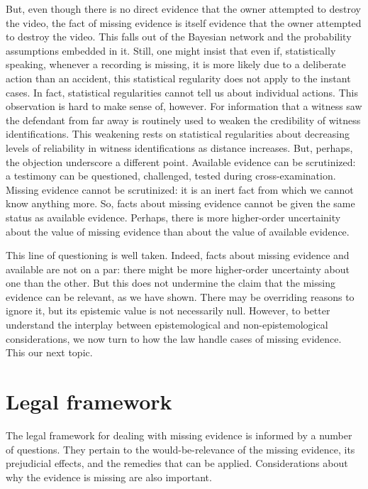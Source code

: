 \documentclass[
  10pt,
  dvipsnames,enabledeprecatedfontcommands]{scrartcl}
\begin{document}
But, even though there is no direct evidence that the owner attempted to
destroy the video, the fact of missing evidence is itself evidence that
the owner attempted to destroy the video. This falls out of the Bayesian
network and the probability assumptions embedded in it. Still, one might
insist that even if, statistically speaking, whenever a recording is
missing, it is more likely due to a deliberate action than an accident,
this statistical regularity does not apply to the instant cases. In
fact, statistical regularities cannot tell us about individual actions.
This observation is hard to make sense of, however. For information that
a witness saw the defendant from far away is routinely used to weaken
the credibility of witness identifications. This weakening rests on
statistical regularities about decreasing levels of reliability in
witness identifications as distance increases. But, perhaps, the
objection underscore a different point. Available evidence can be
scrutinized: a testimony can be questioned, challenged, tested during
cross-examination. Missing evidence cannot be scrutinized: it is an
inert fact from which we cannot know anything more. So, facts about
missing evidence cannot be given the same status as available evidence.
Perhaps, there is more higher-order uncertainity about the value of
missing evidence than about the value of available evidence.

This line of questioning is well taken. Indeed, facts about missing
evidence and available are not on a par: there might be more
higher-order uncertainty about one than the other. But this does not
undermine the claim that the missing evidence can be relevant, as we
have shown. There may be overriding reasons to ignore it, but its
epistemic value is not necessarily null. However, to better understand
the interplay between epistemological and non-epistemological
considerations, we now turn to how the law handle cases of missing
evidence. This our next topic.

\hypertarget{legal-framework}{%
\section{Legal framework}\label{legal-framework}}

\label{sec:legal-framework}

The legal framework for dealing with missing evidence is informed by a
number of questions. They pertain to the would-be-relevance of the
missing evidence, its prejudicial effects, and the remedies that can be
applied. Considerations about why the evidence is missing are also
important.
\end{document}
